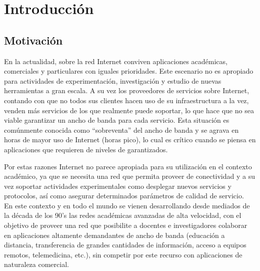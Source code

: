 
\chapter{Introducci\'on}

\ifpdf
    \graphicspath{{Chapter1/Figs/Raster/}{Chapter1/Figs/PDF/}{Chapter2/Figs/}}
\else
    \graphicspath{{Chapter1/Figs/Vector/}{Chapter1/Figs/}}
\fi


\section{Motivación}

En la actualidad, sobre la red Internet conviven aplicaciones académicas, comerciales y particulares con iguales prioridades. Este escenario no es apropiado para actividades de experimentación, investigación y estudio de nuevas herramientas a gran escala. A su vez los proveedores de servicios sobre Internet, contando con que no todos sus clientes hacen uso de su infraestructura a la vez, venden m\'as servicios de los que realmente puede soportar, lo que hace que no sea viable garantizar un ancho de banda para cada servicio. Esta situación es comúnmente conocida como “sobreventa” del ancho de banda y se agrava en horas de mayor uso de Internet (horas pico), lo cual es crítico cuando se piensa en aplicaciones que requieren de niveles de  garantizados.

Por estas razones Internet no parece apropiada para su utilización en el contexto académico, ya que se necesita una red que permita proveer de conectividad y a su vez soportar actividades experimentales como desplegar nuevos servicios y protocolos, así como asegurar determinados parámetros de calidad de servicio.\\ 

En este contexto y en todo el mundo se vienen desarrollando desde mediados de la década de los 90’s las redes académicas avanzadas de alta velocidad, con el objetivo de proveer una red que posibilite a docentes e investigadores colaborar en aplicaciones altamente demandantes de ancho de banda   
 (educación a distancia, transferencia de grandes cantidades de información, acceso a equipos remotos, telemedicina, etc.), sin competir por este recurso con aplicaciones de naturaleza comercial.

